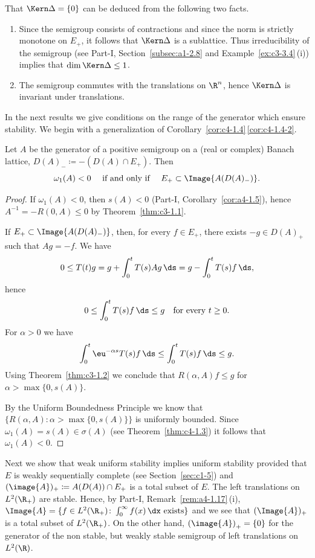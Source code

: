 That $\Kern\Delta = \{0\}$ can be deduced from the following two facts.
\begin{enumerate}[\upshape (i), wide, labelindent=.25em]
\item 
Since the semigroup consists of contractions and since the norm is strictly monotone on $E_{+}$, it follows that $\Kern\Delta$ is a sublattice.
Thus irreducibility of the semigroup (see Part-I, Section~\ref{subsec:a1-2.8} and Example~\ref{ex:c3-3.4}\,(i)) implies that $\dim \Kern\Delta \leq 1$.

\item 
The semigroup commutes with the translations on $\R^{n}$, hence $\Kern\Delta$ is invariant under translations.

\end{enumerate}
In the next results we give conditions on the range of the generator which ensure stability.
We begin with a generalization of Corollary~\ref{cor:c4-1.4}\,\ref{cor:c4-1.4-2}.
\begin{proposition}\label{prop:c4-1.6}
%
Let $A$ be the generator of a positive semigroup on a (real or complex) Banach lattice, $D(A)_{-} \coloneqq -(D(A) \cap E_{+})$.
Then 
\[ 
\text{$\omega_{1}(A) < 0 $ \quad if and only if \quad $E_{+} \subset \Image{A(D(A)_{-})}$.}
\]
\end{proposition}
\begin{proof}
If\/ $\omega_{1}(A) < 0$, then $s(A) < 0$ (Part-I, Corollary~\ref{cor:a4-1.5}), hence $A^{-1} = -R(0,A) \leq 0$ by Theorem~\ref{thm:c3-1.1}.

If\/ $E_{+} \subset \Image{A(D(A)_{-})}$, then, for every $f \in E_{+}$, there exists $-g \in D(A)_{+}$ such that $Ag = -f$.
We have 
\[
0 \leq T(t)g = g + \int_{0}^{t} T(s)Ag \, \ds = g - \int_{0}^{t} T(s)f \, \ds,
\]
hence 
\[
0 \leq \int_{0}^{t} T(s)f \, \ds \leq g 
\quad \text{for every $t \geq 0$.}
\]
For $\alpha > 0$ we have 
\[
\int_{0}^{t} \eu^{-\alpha s}T(s)f \, \ds \leq \int_{0}^{t} T(s)f \, \ds \leq g .
\]
Using Theorem~\ref{thm:c3-1.2}  we conclude that $R(\alpha,A)f \leq g$ for $\alpha > \max\{0,s(A)\}$.

By the Uniform Boundedness Principle we know that $\{R(\alpha,A) \colon \alpha > \max\{0,s(A)\}\}$ is uniformly bounded.
Since $\omega_{1}(A) = s(A) \in \sigma(A)$ (see Theorem~\ref{thm:c4-1.3}) it follows that $\omega_{1}(A) < 0$.
\end{proof}
Next we show that weak uniform stability implies uniform stability provided that $E$ is weakly sequentially complete (see Section~\ref{sec:c1-5}) and $(\image{A})_{+} \coloneqq A(D(A)) \cap E_{+}$ is a total subset of\/ $E$.
The left translations on $L^{2}(\R_{+})$ are stable.
Hence, by Part-I, Remark~\ref{rem:a4-1.17}\,(i), $\Image{A} = \{f \in L^{2}(\R_{+}) \colon \int_{0}^{\infty} f(x) \, \dx \text{ exists}\}$ and we see that $(\Image{A})_{+}$ is a total subset of\/ $L^{2}(\R_{+})$.
On the other hand, $\mleft(\image{A}\mright)_{+} = \{0\}$ for the generator of the non stable, but weakly stable semigroup of left translations on $L^{2}(\R)$.

